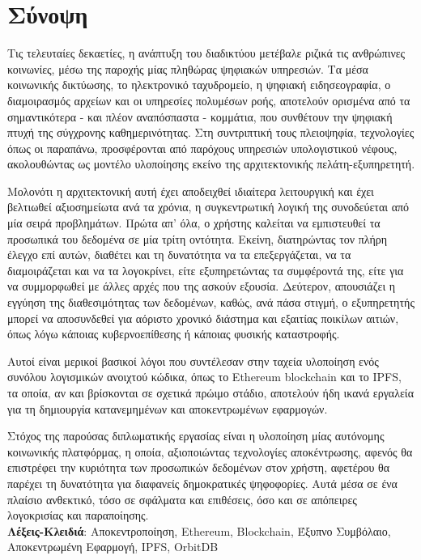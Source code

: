 \chapter*{Σύνοψη}
Τις τελευταίες δεκαετίες, η ανάπτυξη του διαδικτύου μετέβαλε ριζικά τις ανθρώπινες
κοινωνίες, μέσω της παροχής μίας πληθώρας ψηφιακών υπηρεσιών. Τα μέσα κοινωνικής δικτύωσης,
το ηλεκτρονικό ταχυδρομείο, η ψηφιακή ειδησεογραφία, ο διαμοιρασμός αρχείων και
οι υπηρεσίες πολυμέσων ροής, αποτελούν ορισμένα από τα σημαντικότερα - και πλέον αναπόσπαστα - κομμάτια,
που συνθέτουν την ψηφιακή πτυχή της σύγχρονης καθημερινότητας. Στη συντριπτική τους πλειοψηφία,
τεχνολογίες όπως οι παραπάνω, προσφέρονται από παρόχους υπηρεσιών υπολογιστικού νέφους, ακολουθώντας
ως μοντέλο υλοποίησης εκείνο της αρχιτεκτονικής πελάτη-εξυπηρετητή.

Μολονότι η αρχιτεκτονική αυτή έχει αποδειχθεί ιδιαίτερα λειτουργική και έχει βελτιωθεί αξιοσημείωτα ανά τα χρόνια, η συγκεντρωτική λογική της συνοδεύεται από μία σειρά προβλημάτων. Πρώτα απ' όλα, ο χρήστης καλείται να εμπιστευθεί τα προσωπικά του δεδομένα σε μία τρίτη οντότητα. Εκείνη, διατηρώντας τον πλήρη έλεγχο επί αυτών, διαθέτει και τη δυνατότητα
να τα επεξεργάζεται, να τα διαμοιράζεται και να τα λογοκρίνει, είτε εξυπηρετώντας τα συμφέροντά της, είτε για να 
συμμορφωθεί με άλλες αρχές που της ασκούν εξουσία. Δεύτερον, απουσιάζει η εγγύηση της διαθεσιμότητας των δεδομένων, καθώς,
 ανά πάσα στιγμή, ο εξυπηρετητής μπορεί να αποσυνδεθεί για αόριστο χρονικό διάστημα και εξαιτίας ποικίλων αιτιών, όπως λόγω κάποιας
κυβερνοεπίθεσης ή κάποιας φυσικής καταστροφής.

Αυτοί είναι μερικοί βασικοί λόγοι που συντέλεσαν στην ταχεία υλοποίηση ενός συνόλου λογισμικών ανοιχτού κώδικα, όπως το Ethereum blockchain και το IPFS, τα οποία, αν και βρίσκονται σε σχετικά πρώιμο στάδιο, αποτελούν ήδη ικανά εργαλεία για τη δημιουργία κατανεμημένων και αποκεντρωμένων εφαρμογών.

Στόχος της παρούσας διπλωματικής εργασίας είναι η υλοποίηση μίας αυτόνομης κοινωνικής πλατφόρμας,
η οποία, αξιοποιώντας τεχνολογίες αποκέντρωσης, αφενός θα επιστρέφει την κυριότητα των προσωπικών
δεδομένων στον χρήστη, αφετέρου θα παρέχει τη δυνατότητα για διαφανείς δημοκρατικές ψηφοφορίες. Αυτά μέσα σε ένα πλαίσιο ανθεκτικό, τόσο σε σφάλματα και επιθέσεις, όσο και σε απόπειρες λογοκρισίας και παραποίησης.
\\[2\baselineskip]
\textbf{Λέξεις-Κλειδιά}: Αποκεντροποίηση, Ethereum, Blockchain, Έξυπνο Συμβόλαιο, Αποκεντρωμένη Εφαρμογή, IPFS, OrbitDB
